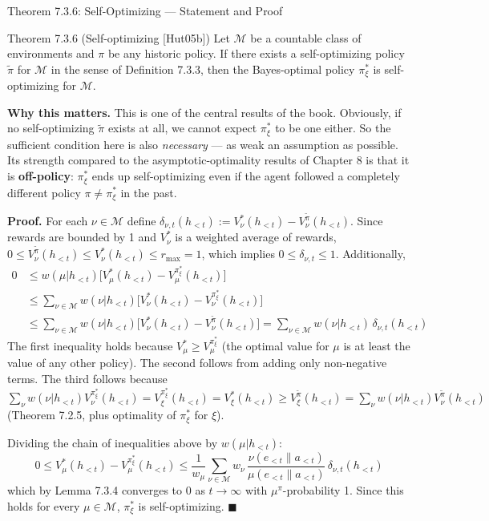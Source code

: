 \documentclass[aspectratio=169,10pt]{beamer}
\newcommand{\Mcal}{\mathcal{M}}
\begin{document}
\begin{frame}[allowframebreaks]{Theorem 7.3.6: Self-Optimizing --- Statement and Proof}
  \begin{block}{Theorem 7.3.6 (Self-optimizing [Hut05b])}
    Let $\Mcal$ be a countable class of environments and $\pi$ be any
    historic policy. If there exists a self-optimizing policy $\tilde\pi$
    for $\Mcal$ in the sense of Definition 7.3.3, then the Bayes-optimal
    policy $\pi_\xi^*$ is self-optimizing for $\Mcal$.
  \end{block}
  \textbf{Why this matters.} This is one of the central results of the
  book. Obviously, if no self-optimizing $\tilde\pi$ exists at all, we
  cannot expect $\pi_\xi^*$ to be one either. So the sufficient condition
  here is also \emph{necessary} --- as weak an assumption as possible. Its
  strength compared to the asymptotic-optimality results of Chapter 8 is
  that it is \textbf{off-policy}: $\pi_\xi^*$ ends up self-optimizing even
  if the agent followed a completely different policy $\pi\ne\pi_\xi^*$ in
  the past.

  \framebreak
  \textbf{Proof.} For each $\nu\in\Mcal$ define
  $\delta_{\nu,t}(h_{<t}) := V_\nu^*(h_{<t}) - V_\nu^{\tilde\pi}(h_{<t})$.
  Since rewards are bounded by 1 and $V_\nu^*$ is a weighted average of
  rewards, $0\le V_\nu^{\tilde\pi}(h_{<t})\le V_\nu^*(h_{<t})\le r_{\max}=1$,
  which implies $0\le\delta_{\nu,t}\le1$. Additionally,
  \begin{align*}
    0 &\le w(\mu|h_{<t})\big[V_\mu^*(h_{<t}) - V_\mu^{\pi_\xi^*}(h_{<t})\big] \\
      &\le \sum_{\nu\in\Mcal} w(\nu|h_{<t})\big[V_\nu^*(h_{<t}) - V_\nu^{\pi_\xi^*}(h_{<t})\big] \\
      &\le \sum_{\nu\in\Mcal} w(\nu|h_{<t})\big[V_\nu^*(h_{<t}) - V_\nu^{\tilde\pi}(h_{<t})\big]
      = \sum_{\nu\in\Mcal} w(\nu|h_{<t})\,\delta_{\nu,t}(h_{<t})
  \end{align*}
  The first inequality holds because $V_\mu^*\ge V_\mu^{\pi_\xi^*}$ (the
  optimal value for $\mu$ is at least the value of any other policy). The
  second follows from adding only non-negative terms. The third follows
  because
  $\sum_\nu w(\nu|h_{<t})V_\nu^{\pi_\xi^*}(h_{<t}) = V_\xi^{\pi_\xi^*}(h_{<t})
  = V_\xi^*(h_{<t}) \ge V_\xi^{\tilde\pi}(h_{<t})
  = \sum_\nu w(\nu|h_{<t})V_\nu^{\tilde\pi}(h_{<t})$
  (Theorem 7.2.5, plus optimality of $\pi_\xi^*$ for $\xi$).

  \framebreak
  Dividing the chain of inequalities above by $w(\mu|h_{<t})$:
  \[
    0 \le V_\mu^*(h_{<t}) - V_\mu^{\pi_\xi^*}(h_{<t})
    \le \frac{1}{w_\mu}\sum_{\nu\in\Mcal}w_\nu\,
    \frac{\nu(e_{<t}\|a_{<t})}{\mu(e_{<t}\|a_{<t})}\,\delta_{\nu,t}(h_{<t})
  \]
  which by Lemma 7.3.4 converges to $0$ as $t\to\infty$ with
  $\mu^\pi$-probability 1. Since this holds for every $\mu\in\Mcal$,
  $\pi_\xi^*$ is self-optimizing. $\blacksquare$
\end{frame}
\end{document}
